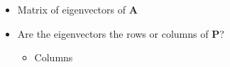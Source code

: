 \documentclass[
  letterpaper,
  DIV=11,
  numbers=noendperiod]{scrartcl}
\providecommand{\tightlist}{%
  \setlength{\itemsep}{0pt}\setlength{\parskip}{0pt}}\usepackage{longtable,booktabs,array}
\begin{document}
\begin{itemize}
\begin{itemize}
\begin{itemize}
      \begin{itemize}
      \tightlist
      \item
        Matrix of eigenvectors of \(\symbf{A}\)
      \item
        Are the eigenvectors the rows or columns of \(\symbf{P}\)?

        \begin{itemize}
        \tightlist
        \item
          Columns
        \end{itemize}
      \end{itemize}
    \end{itemize}
  \end{itemize}
\end{itemize}
\end{document}
